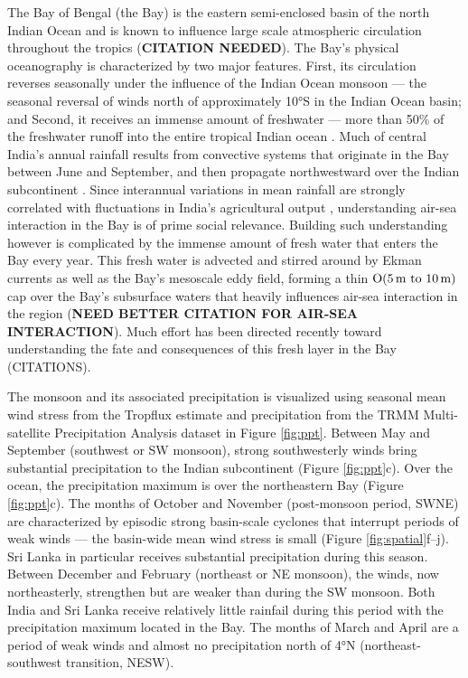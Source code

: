 \documentclass[twocol]{ametsoc}
\begin{document}
The Bay of Bengal (the Bay) is the eastern semi-enclosed basin of the north Indian Ocean and is known to influence large scale atmospheric circulation throughout the tropics (\textbf{CITATION NEEDED}).
The Bay's physical oceanography is characterized by two major features.
First, its circulation reverses seasonally under the influence of the Indian Ocean monsoon --- the seasonal reversal of winds north of approximately 10°S in the Indian Ocean basin; and
Second, it receives an immense amount of freshwater --- more than 50\% of the freshwater runoff into the entire tropical Indian ocean \citep{Sengupta2006,Gordon2016}.
Much of central India's annual rainfall results from convective systems that originate in the Bay between June and September, and then propagate northwestward over the Indian subcontinent \citep{Gadgil2003a}.
Since interannual variations in mean rainfall are strongly correlated with fluctuations in India's agricultural output \citep{Gadgil2006}, understanding air-sea interaction in the Bay is of prime social relevance.
Building such understanding however is complicated by the immense amount of fresh water that enters the Bay every year.
This fresh water is advected and stirred around by Ekman currents as well as the Bay's mesoscale eddy field, forming a thin \(\mO(\SIrange{5}{10}{m})\) cap over the Bay's subsurface waters that heavily influences air-sea interaction in the region \citep{Sengupta2016,SreeLekha2018,Rao2011} (\textbf{NEED BETTER CITATION FOR AIR-SEA INTERACTION}).
Much effort has been directed recently toward understanding the fate and consequences of this fresh layer in the Bay (CITATIONS).

The monsoon and its associated precipitation is visualized using seasonal mean wind stress from the Tropflux estimate \citep{Kumar2012} and precipitation from the TRMM Multi-satellite Precipitation Analysis dataset \citep{trmm} in Figure \ref{fig:ppt}.
Between May and September (southwest or SW monsoon), strong southwesterly winds bring substantial precipitation to the Indian subcontinent (Figure \ref{fig:ppt}c).
Over the ocean, the precipitation maximum is over the northeastern Bay (Figure \ref{fig:ppt}c).
The months of October and November (post-monsoon period, SWNE) are characterized by episodic strong basin-scale cyclones that interrupt periods of weak winds --- the basin-wide mean wind stress is small (Figure \ref{fig:spatial}f--j).
Sri Lanka in particular receives substantial precipitation during this season.
Between December and February (northeast or NE monsoon), the winds, now northeasterly, strengthen but are weaker than during the SW monsoon.
Both India and Sri Lanka receive relatively little rainfail during this period with the precipitation maximum located in the Bay.
The months of March and April are a period of weak winds and almost no precipitation north of 4°N (northeast-southwest transition, NESW).
\end{document}
